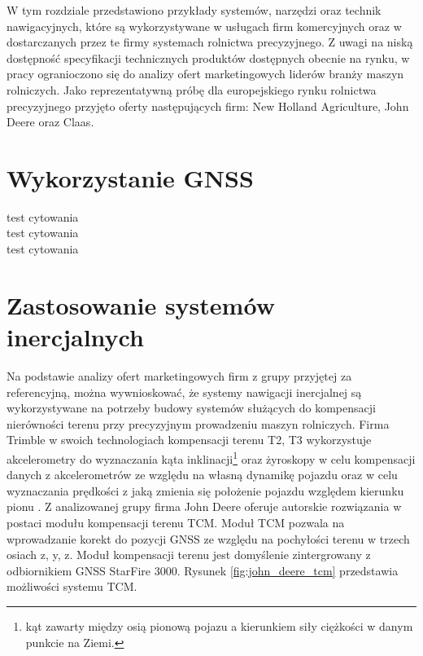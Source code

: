 W tym rozdziale przedstawiono przykłady systemów, narzędzi oraz technik nawigacyjnych, które są wykorzystywane w usługach firm komercyjnych 
oraz w dostarczanych przez te firmy systemach rolnictwa precyzyjnego. Z uwagi na niską dostępność specyfikacji technicznych produktów 
dostępnych obecnie na rynku, w pracy ogranioczono się do analizy ofert marketingowych liderów branży maszyn rolniczych.
Jako reprezentatywną próbę dla europejskiego rynku rolnictwa precyzyjnego przyjęto oferty następujących firm: New Holland Agriculture,
John Deere oraz Claas.
\section{Wykorzystanie GNSS}
 test cytowania \cite{CLAAS_stearing_systems}\\
	test cytowania \cite{JOHN_DEERE_solutions}\\
	test cytowania \cite{NEW_HOLLAND_PLM}


\section{Zastosowanie systemów inercjalnych}
Na podstawie analizy ofert marketingowych firm z grupy przyjętej za referencyjną, można wywnioskować, że systemy nawigacji inercjalnej 
są wykorzystywane na potrzeby budowy systemów służących do kompensacji nierówności terenu przy precyzyjnym prowadzeniu maszyn rolniczych.
Firma Trimble w swoich technologiach kompensacji terenu T2, T3 wykorzystuje akcelerometry do wyznaczania kąta inklinacji\footnote{kąt zawarty między osią 
pionową pojazu a kierunkiem siły ciężkości w danym punkcie na Ziemi.} oraz żyroskopy w celu kompensacji danych z akcelerometrów ze względu na własną dynamikę pojazdu oraz 
w celu wyznaczania prędkości z jaką zmienia się położenie pojazdu względem kierunku pionu \cite[]{TRIMBLE}.
Z analizowanej grupy firma John Deere oferuje autorskie rozwiązania w postaci modułu kompensacji terenu TCM. Moduł TCM pozwala na wprowadzanie korekt 
do pozycji GNSS ze względu na pochyłości terenu w trzech osiach z, y, z. Moduł kompensacji terenu jest domyślenie zintergrowany z odbiornikiem GNSS StarFire 3000.
Rysunek \ref{fig:john_deere_tcm} przedstawia możliwości systemu TCM. 

